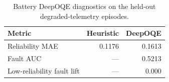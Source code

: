 \begin{table}[ht]
\centering
\caption{Battery DeepOQE diagnostics on the held-out degraded-telemetry episodes.}
\label{tab:battery-deep-oqe-summary}
\begin{tabular}{lrr}
\toprule
Metric & Heuristic & DeepOQE \\
\midrule
Reliability MAE & 0.1176 & 0.1613 \\
Fault AUC & --- & 0.5213 \\
Low-reliability fault lift & --- & 0.000 \\
\bottomrule
\end{tabular}
\end{table}
